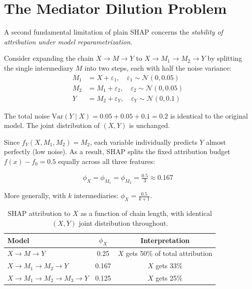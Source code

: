 \documentclass[12pt]{article}
\begin{document}
\section{The Mediator Dilution Problem}

A second fundamental limitation of plain SHAP concerns the \emph{stability of attribution
under model reparametrization}.

Consider expanding the chain $X \to M \to Y$ to $X \to M_1 \to M_2 \to Y$ by splitting
the single intermediary $M$ into two steps, each with half the noise variance:
\begin{align}
M_1 &= X + \varepsilon_1, \quad \varepsilon_1 \sim \mathcal{N}(0, 0.05) \\
M_2 &= M_1 + \varepsilon_2, \quad \varepsilon_2 \sim \mathcal{N}(0, 0.05) \\
Y &= M_2 + \varepsilon_Y, \quad \varepsilon_Y \sim \mathcal{N}(0, 0.1)
\end{align}

The total noise $\text{Var}(Y \mid X) = 0.05 + 0.05 + 0.1 = 0.2$ is identical to the
original model. The joint distribution of $(X, Y)$ is unchanged.

Since $f_Y(X, M_1, M_2) = M_2$, each variable individually predicts $Y$ almost perfectly
(low noise). As a result, SHAP splits the fixed attribution budget $f(x) - f_0 = 0.5$
equally across all three features:

\begin{equation}
\phi_X = \phi_{M_1} = \phi_{M_2} = \tfrac{0.5}{3} \approx 0.167
\end{equation}

More generally, with $k$ intermediaries: $\phi_X = \frac{0.5}{k+1}$.

\begin{table}[h]
\centering
\begin{tabular}{lcc}
\toprule
Model & $\phi_X$ & Interpretation \\
\midrule
$X \to M \to Y$              & 0.25  & $X$ gets 50\% of total attribution \\
$X \to M_1 \to M_2 \to Y$   & 0.167 & $X$ gets 33\% \\
$X \to M_1 \to M_2 \to M_3 \to Y$ & 0.125 & $X$ gets 25\% \\
\bottomrule
\end{tabular}
\caption{SHAP attribution to $X$ as a function of chain length, with identical $(X,Y)$
joint distribution throughout.}
\end{table}
\end{document}
